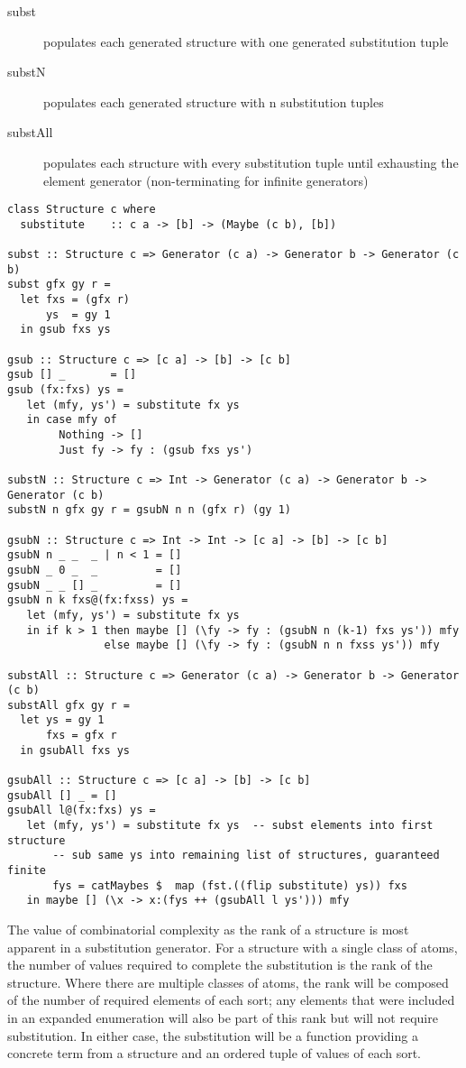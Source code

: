 \begin{description}
\item[subst] populates each generated structure with one generated substitution tuple
\item[substN] populates each generated structure with n substitution tuples
\item[substAll] populates each structure with every substitution tuple
        until exhausting the element generator (non-terminating for infinite generators)
\end{description}


\begin{lstlisting}
class Structure c where
  substitute    :: c a -> [b] -> (Maybe (c b), [b])

subst :: Structure c => Generator (c a) -> Generator b -> Generator (c b)
subst gfx gy r =  
  let fxs = (gfx r)
      ys  = gy 1
  in gsub fxs ys

gsub :: Structure c => [c a] -> [b] -> [c b]
gsub [] _       = []
gsub (fx:fxs) ys = 
   let (mfy, ys') = substitute fx ys
   in case mfy of
        Nothing -> []
        Just fy -> fy : (gsub fxs ys')

substN :: Structure c => Int -> Generator (c a) -> Generator b -> Generator (c b)
substN n gfx gy r = gsubN n n (gfx r) (gy 1)

gsubN :: Structure c => Int -> Int -> [c a] -> [b] -> [c b]
gsubN n _ _  _ | n < 1 = []
gsubN _ 0 _  _         = []
gsubN _ _ [] _         = []
gsubN n k fxs@(fx:fxss) ys = 
   let (mfy, ys') = substitute fx ys
   in if k > 1 then maybe [] (\fy -> fy : (gsubN n (k-1) fxs ys')) mfy
               else maybe [] (\fy -> fy : (gsubN n n fxss ys')) mfy 

substAll :: Structure c => Generator (c a) -> Generator b -> Generator (c b)
substAll gfx gy r = 
  let ys = gy 1
      fxs = gfx r
  in gsubAll fxs ys

gsubAll :: Structure c => [c a] -> [b] -> [c b]
gsubAll [] _ = []
gsubAll l@(fx:fxs) ys = 
   let (mfy, ys') = substitute fx ys  -- subst elements into first structure
       -- sub same ys into remaining list of structures, guaranteed finite
       fys = catMaybes $  map (fst.((flip substitute) ys)) fxs
   in maybe [] (\x -> x:(fys ++ (gsubAll l ys'))) mfy
\end{lstlisting}

The value of combinatorial complexity as the rank of a structure
is most apparent in a substitution generator.
For a structure with a single class of atoms,
the number of values required to complete the substitution 
is the rank of the structure.
Where there are multiple classes of atoms,
the rank will be composed of the number of required elements of each sort;
any elements that were included in an expanded enumeration
will also be part of this rank but will not require substitution.
In either case, the substitution will be a function 
providing a concrete term from a structure
and an ordered tuple of values of each sort.

